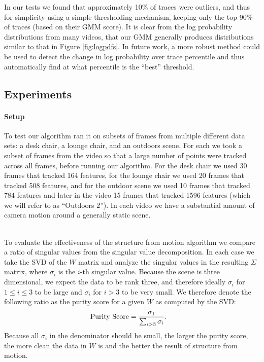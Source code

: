 In our tests we found that approximately 10\% of traces were outliers, and thus
for simplicity using a simple thresholding mechanism, keeping only the top 90\%
of traces (based on their GMM score).  It is clear from the log probability
distributions from many videos, that our GMM generally produces distributions
similar to that in Figure \ref{fig:logpdfs}.  In future work, a more robust
method could be used to detect the change in log probability over trace
percentile and thus automatically find at what percentile is the ``best''
threshold.


\subsection{Experiments} %
\label{sub:Experiments}

\paragraph{Setup} 
To test our algorithm ran it on subsets of frames from multiple different data
sets: a desk chair, a lounge chair, and an outdoors scene.  For each we took a
subset of frames from the video so that a large number of points were tracked
across all frames, before running our algorithm.  For the desk chair we used 30
frames that tracked 164 features, for the lounge chair we used 20 frames that
tracked 508 features, and for the outdoor scene we used 10 frames that tracked
784 features and later in the video 15 frames that tracked 1596 features (which
we will refer to as ``Outdoors 2'').  In each video we have a substantial
amount of camera motion around a generally static scene.

\\
To evaluate the effectiveness of the structure from motion algorithm we compare
a ratio of singular values from the singular value decomposition.  In each case
we take the SVD of the $W$ matrix and analyze the singular values in the
resulting $\Sigma$ matrix, where $\sigma_i$ is the $i$-th singular value.
Because the scene is three dimensional, we expect the data to be rank three,
and therefore ideally $\sigma_i$ for $1 \leq i \leq 3$ to be large and $\sigma_i$ for $i
> 3$ to be very small.  We therefore denote the following ratio as the purity
score for a given $W$ as computed by the SVD:
\begin{align}
	{\rm Purity\ Score} &= \frac{\sigma_1}{\sum_{i > 3} \sigma_i}.
\end{align}
Because all $\sigma_i$ in the denominator should be small, the larger the
purity score, the more clean the data in $W$ is and the better the result of
structure from motion.

